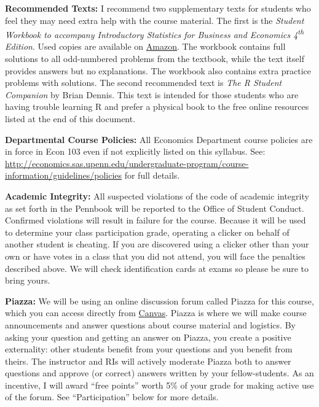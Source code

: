 \documentclass[11pt, letterpaper]{article}
\begin{document}
\bigskip

\noindent \textbf{Recommended Texts:} 
I recommend two supplementary texts for students who feel they may need extra help with the course material. 
The first is the \emph{Student Workbook to accompany Introductory Statistics for Business and Economics 4\textsuperscript{th} Edition}. 
Used copies are available on \href{http://www.amazon.com/gp/offer-listing/0471508993/sr=/qid=/ref=olp_page_2?ie=UTF8&colid=&coliid=&condition=all&me=&qid=&shipPromoFilter=0&sort=sip&sr=&startIndex=10}{Amazon}. 
The workbook contains full solutions to all odd-numbered problems from the textbook, while the text itself provides answers but no explanations. 
The workbook also contains extra practice problems with solutions. The second recommended text is \emph{The R Student Companion} by Brian Dennis.
This text is intended for those students who are having trouble learning R and prefer a physical book to the free online resources listed at the end of this document. 

\bigskip

%

\noindent \textbf{Departmental Course Policies: } 
All Economics Department course policies are in force in Econ 103 even if not explicitly listed on this syllabus. 
See: \url{http://economics.sas.upenn.edu/undergraduate-program/course-information/guidelines/policies} for full details. 


\bigskip


\noindent \textbf{Academic Integrity: } 
All suspected violations of the code of academic integrity as set forth in the Pennbook will be reported to the Office of Student Conduct. 
Confirmed violations will result in failure for the course. 
Because it will be used to determine your class participation grade, operating a clicker on behalf of another student is cheating. 
If you are discovered using a clicker other than your own or have votes in a class that you did not attend, you will face the penalties described above. 
We will check identification cards at exams so please be sure to bring yours.

\bigskip

\noindent \textbf{Piazza:} 
We will be using an online discussion forum called Piazza for this course, which you can access directly from \href{http://upenn.instructure.com}{Canvas}. 
Piazza is where we will make course announcements and answer questions about course material and logistics.
By asking your question and getting an answer on Piazza, you create a positive externality: other students benefit from your questions and you benefit from theirs. 
The instructor and RIs will actively moderate Piazza both to answer questions and approve (or correct) answers written by your fellow-students.
As an incentive, I will award ``free points'' worth 5\% of your grade for making active use of the forum. 
See ``Participation'' below for more details.
\end{document}

